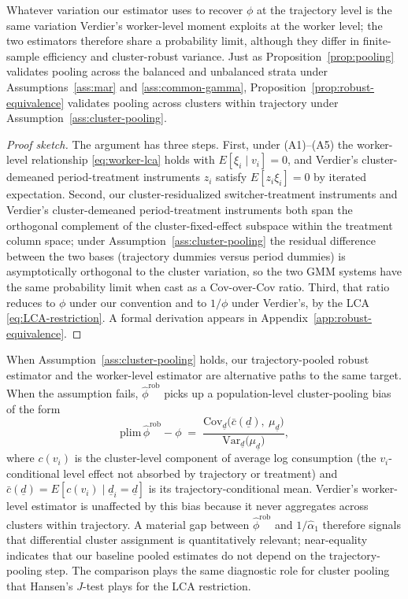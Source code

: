 Whatever variation our estimator uses to recover $\phi$ at the trajectory level is the same variation Verdier's worker-level moment exploits at the worker level; the two estimators therefore share a probability limit, although they differ in finite-sample efficiency and cluster-robust variance.
Just as Proposition~\ref{prop:pooling} validates pooling across the balanced and unbalanced strata under Assumptions~\ref{ass:mar} and \ref{ass:common-gamma}, Proposition~\ref{prop:robust-equivalence} validates pooling across clusters within trajectory under Assumption~\ref{ass:cluster-pooling}.

\begin{proof}[Proof sketch]
The argument has three steps.
First, under (A1)--(A5) the worker-level relationship \eqref{eq:worker-lca} holds with $E[\xi_i \mid v_i] = 0$, and Verdier's cluster-demeaned period-treatment instruments $z_i$ satisfy $E[z_i \xi_i] = 0$ by iterated expectation.
Second, our cluster-residualized switcher-treatment instruments and Verdier's cluster-demeaned period-treatment instruments both span the orthogonal complement of the cluster-fixed-effect subspace within the treatment column space; under Assumption~\ref{ass:cluster-pooling} the residual difference between the two bases (trajectory dummies versus period dummies) is asymptotically orthogonal to the cluster variation, so the two GMM systems have the same probability limit when cast as a Cov-over-Cov ratio.
Third, that ratio reduces to $\phi$ under our convention and to $1/\phi$ under Verdier's, by the LCA \eqref{eq:LCA-restriction}.
A formal derivation appears in Appendix~\ref{app:robust-equivalence}.
\end{proof}

When Assumption~\ref{ass:cluster-pooling} holds, our trajectory-pooled robust estimator and the worker-level estimator are alternative paths to the same target.
When the assumption fails, $\hat\phi^{\mathrm{rob}}$ picks up a population-level cluster-pooling bias of the form
\begin{equation}\label{eq:cluster-pooling-bias}
\mathrm{plim}\,\hat\phi^{\mathrm{rob}} - \phi \;=\; \frac{\mathrm{Cov}_{\underline d}\!\big(\bar c(\underline d),\ \mu_{\underline d}\big)}{\mathrm{Var}_{\underline d}\!\big(\mu_{\underline d}\big)},
\end{equation}
where $c(v_i)$ is the cluster-level component of average log consumption (the $v_i$-conditional level effect not absorbed by trajectory or treatment) and $\bar c(\underline d) = E[c(v_i)\mid \underline d_i=\underline d]$ is its trajectory-conditional mean.
Verdier's worker-level estimator is unaffected by this bias because it never aggregates across clusters within trajectory.
A material gap between $\hat\phi^{\mathrm{rob}}$ and $1/\hat\alpha_1$ therefore signals that differential cluster assignment is quantitatively relevant; near-equality indicates that our baseline pooled estimates do not depend on the trajectory-pooling step.
The comparison plays the same diagnostic role for cluster pooling that Hansen's $J$-test plays for the LCA restriction.

